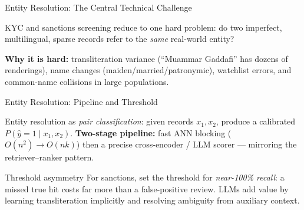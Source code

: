 \documentclass[9pt,t]{beamer}
\begin{document}
\begin{frame}{Entity Resolution: The Central Technical Challenge}
\begin{bigpicture}
KYC and sanctions screening reduce to one hard problem: do two imperfect,
multilingual, sparse records refer to the \emph{same} real-world entity?
\end{bigpicture}

\medskip
\textbf{Why it is hard:} transliteration variance (``Muammar Gaddafi'' has dozens
of renderings), name changes (maiden/married/patronymic), watchlist errors, and
common-name collisions in large populations.
\end{frame}

\begin{frame}{Entity Resolution: Pipeline and Threshold}
\begin{underhood}
Entity resolution as \emph{pair classification}: given records $x_1,x_2$, produce
a calibrated $P(\hat y = 1 \mid x_1,x_2)$.
\textbf{Two-stage pipeline:} fast ANN blocking ($O(n^2)\to O(nk)$) then a precise
cross-encoder / LLM scorer --- mirroring the retriever--ranker pattern.
\end{underhood}

\medskip
\begin{alertblock}{Threshold asymmetry}
For sanctions, set the threshold for \emph{near-100\% recall}: a missed true hit
costs far more than a false-positive review. LLMs add value by learning
transliteration implicitly and resolving ambiguity from auxiliary context.
\end{alertblock}
\end{frame}
\end{document}
